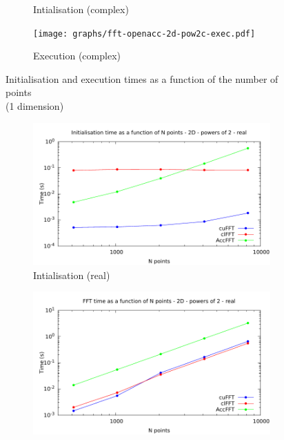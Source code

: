 \documentclass[12pt, a4paper]{article}
\begin{document}
\begin{figure}[H]
\begin{subfigure}{.5\textwidth}
\centering
\caption{Intialisation (complex)}
\label{FFTACC1DCI}
\end{subfigure}%
\begin{subfigure}{.5\textwidth}
\centering
\texttt{[image: graphs/fft-openacc-2d-pow2c-exec.pdf]}
\caption{Execution (complex)}
\label{FFTACC1DCE}
\end{subfigure}
\caption{Initialisation and execution times as a function of the number of points\\(1 dimension)}
\label{FFTCL1D}
\end{figure}

\begin{figure}[H]
\captionsetup{width=0.8\linewidth}
\centering
\begin{subfigure}{.5\textwidth}
\centering
\includegraphics[width=.9\linewidth]{graphs/fft-2d-pow2-r-init.pdf}
\caption{Intialisation (real)}
\label{FFTPOW21DRI}
\end{subfigure}%
\begin{subfigure}{.5\textwidth}
\centering
\includegraphics[width=.9\linewidth]{graphs/fft-2d-pow2-r-exec.pdf}

\end{subfigure}
\end{figure}
\end{document}
